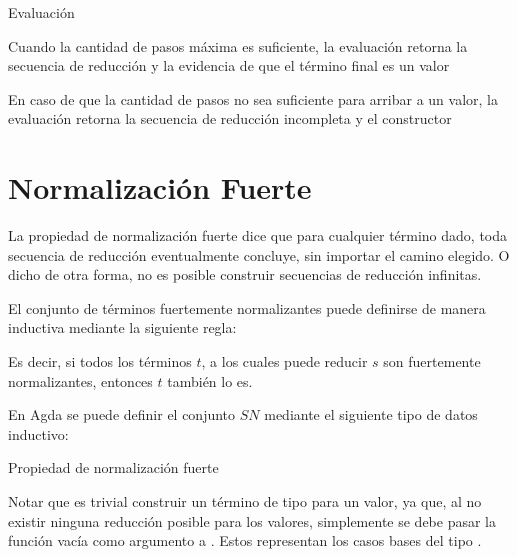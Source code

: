 \begin{codigo}
	Evaluación
\end{codigo}

\begin{example}
	Cuando la cantidad de pasos máxima es suficiente, la evaluación retorna la secuencia de reducción y la evidencia de que el término final es un valor
\end{example}

\begin{example}
	En caso de que la cantidad de pasos no sea suficiente para arribar a un valor, la evaluación retorna la secuencia de reducción incompleta y el constructor 
\end{example}

\section{Normalización Fuerte}

La propiedad de normalización fuerte dice que para cualquier término dado, toda secuencia de reducción eventualmente concluye, sin importar el camino elegido.
O dicho de otra forma, no es posible construir secuencias de reducción infinitas.

El conjunto de términos fuertemente normalizantes puede definirse de manera inductiva mediante la siguiente regla:

\begin{center}
	\begin{prooftree}
	\end{prooftree}
\end{center}

Es decir, si todos los términos $t$, a los cuales puede reducir $s$ son fuertemente normalizantes, entonces $t$ también lo es. 

En Agda se puede definir el conjunto $SN$ mediante el siguiente tipo de datos inductivo: 

\begin{codigo}
	Propiedad de normalización fuerte
\end{codigo}

Notar que es trivial construir un término de tipo  para un valor, ya que, al no existir ninguna reducción posible para los valores, simplemente se debe pasar la función vacía como argumento a .
Estos representan los casos bases del tipo .

